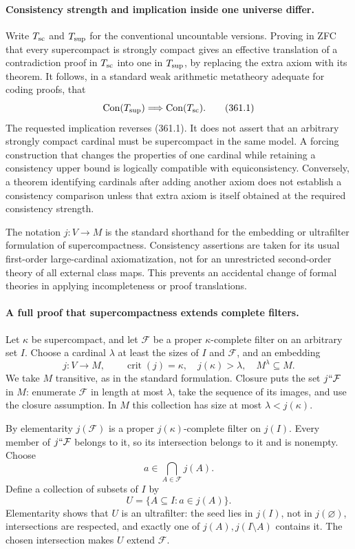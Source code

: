 \documentclass[11pt]{article}
\begin{document}
\paragraph{Consistency strength and implication inside one universe differ.}
Write $T_{\rm sc}$ and $T_{\rm sup}$ for the conventional uncountable
versions. Proving in ZFC that every supercompact is strongly compact
gives an effective translation of a contradiction proof in $T_{\rm sc}$
into one in $T_{\rm sup}$, by replacing the extra axiom with its theorem.
It follows, in a standard weak arithmetic metatheory adequate for coding
proofs, that
\[
 \operatorname{Con}(T_{\rm sup})\Longrightarrow
 \operatorname{Con}(T_{\rm sc}).
 \tag{361.1}
\]
The requested implication reverses (361.1). It does not assert that
an arbitrary strongly compact cardinal must be supercompact in the
same model. A forcing construction that changes the properties of one
cardinal while retaining a consistency upper bound is logically
compatible with equiconsistency. Conversely, a theorem identifying
cardinals after adding another axiom does not establish a consistency
comparison unless that extra axiom is itself obtained at the required
consistency strength.

The notation $j:V\to M$ is the standard shorthand for the embedding
or ultrafilter formulation of supercompactness. Consistency assertions
are taken for its usual first-order large-cardinal axiomatization,
not for an unrestricted second-order theory of all external class maps.
This prevents an accidental change of formal theories in applying
incompleteness or proof translations.

\paragraph{A full proof that supercompactness extends complete filters.}
Let $\kappa$ be supercompact, and let $\mathcal F$ be a proper
$\kappa$-complete filter on an arbitrary set $I$. Choose a cardinal
$\lambda$ at least the sizes of $I$ and $\mathcal F$, and an embedding
\[
 j:V\to M,\qquad \operatorname{crit}(j)=\kappa,
 \quad j(\kappa)>\lambda,\quad M^\lambda\subseteq M.
\]
We take $M$ transitive, as in the standard formulation. Closure puts
the set $j``\mathcal F$ in $M$: enumerate $\mathcal F$ in length at
most $\lambda$, take the sequence of its images, and use the closure
assumption. In $M$ this collection has size at most $\lambda<j(\kappa)$.

By elementarity $j(\mathcal F)$ is a proper $j(\kappa)$-complete
filter on $j(I)$. Every member of $j``\mathcal F$ belongs to it, so
its intersection belongs to it and is nonempty. Choose
\[
 a\in\bigcap_{A\in\mathcal F}j(A).
\]
Define a collection of subsets of $I$ by
\[
 U=\{A\subseteq I:a\in j(A)\}.
 \tag{361.2}
\]
Elementarity shows that $U$ is an ultrafilter: the seed lies in $j(I)$,
not in $j(\varnothing)$, intersections are respected, and exactly one
of $j(A),j(I\setminus A)$ contains it. The chosen intersection makes
$U$ extend $\mathcal F$.
\end{document}
